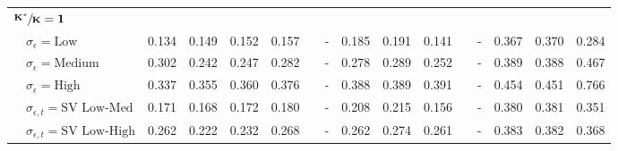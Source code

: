\begin{table}[!tbp]
\begin{center}
\begin{tabular}{lllllcllllcllll}
\hline
{\bfseries $\mathbf{\sfrac{K^*}{K}=1}$}&&&&&&&&&&&&&&\tabularnewline
~~$\sigma_{\epsilon} =\text{Low}$& 0.134& 0.149& 0.152& 0.157&&-& 0.185& 0.191& 0.141&&-& 0.367& 0.370& 0.284\tabularnewline
~~$\sigma_{\epsilon} =\text{Medium}$& 0.302& 0.242& 0.247& 0.282&&-& 0.278& 0.289& 0.252&&-& 0.389& 0.388& 0.467\tabularnewline
~~$\sigma_{\epsilon} =\text{High}$& 0.337& 0.355& 0.360& 0.376&&-& 0.388& 0.389& 0.391&&-& 0.454& 0.451& 0.766\tabularnewline
~~$\sigma_{\epsilon,t} = \text{SV Low-Med}$& 0.171& 0.168& 0.172& 0.180&&-& 0.208& 0.215& 0.156&&-& 0.380& 0.381& 0.351\tabularnewline
~~$\sigma_{\epsilon,t}  = \text{SV Low-High}$& 0.262& 0.222& 0.232& 0.268&&-& 0.262& 0.274& 0.261&&-& 0.383& 0.382& 0.368\tabularnewline
\hline
\end{tabular}\end{center}
\end{table}
